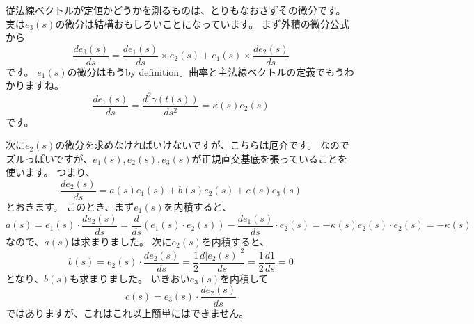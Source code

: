 従法線ベクトルが定値かどうかを測るものは、とりもなおさずその微分です。
実は$e_3(s)$の微分は結構おもしろいことになっています。
まず外積の微分公式から
\[
  \frac{de_3(s)}{ds}=\frac{de_1(s)}{ds}\times e_2(s)+e_1(s)\times\frac{de_2(s)}{ds}
\]
です。
$e_1(s)$の微分はもうby definition。曲率と主法線ベクトルの定義でもうわかりますね。
\[
  \frac{de_1(s)}{ds}=\frac{d^2\gamma(t(s))}{ds^2}=\kappa(s)e_2(s)
\]
です。

次に$e_2(s)$の微分を求めなければいけないですが、こちらは厄介です。
なのでズルっぽいですが、$e_1(s),e_2(s),e_3(s)$が正規直交基底を張っていることを使います。
つまり、
\[
  \frac{de_2(s)}{ds}=a(s)e_1(s)+b(s)e_2(s)+c(s)e_3(s)
\]
とおきます。
このとき、まず$e_1(s)$を内積すると、
\[
  a(s)=e_1(s)\cdot\frac{de_2(s)}{ds}=\frac{d}{ds}(e_1(s)\cdot e_2(s))-\frac{de_1(s)}{ds}\cdot e_2(s)=-\kappa(s)e_2(s)\cdot e_2(s)=-\kappa(s)
\]
なので、$a(s)$は求まりました。
次に$e_2(s)$を内積すると、
\[
  b(s)=e_2(s)\cdot\frac{de_2(s)}{ds}=\frac12\frac{d|e_2(s)|^2}{ds}=\frac12\frac{d1}{ds}=0
\]
となり、$b(s)$も求まりました。
いきおい$e_3(s)$を内積して
\[
  c(s)=e_3(s)\cdot\frac{de_2(s)}{ds}
\]
ではありますが、これはこれ以上簡単にはできません。

